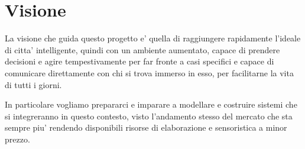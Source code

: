\section{Visione}

La visione che guida questo progetto e' quella di raggiungere rapidamente l'ideale di citta' intelligente, quindi con un ambiente aumentato, capace di prendere decisioni e agire tempestivamente per far fronte a casi specifici e capace di comunicare direttamente con chi si trova immerso in esso, per facilitarne la vita di tutti i giorni. 

In particolare vogliamo prepararci e imparare a modellare e costruire sistemi che si integreranno in questo contesto, visto l'andamento stesso del mercato che sta sempre piu' rendendo disponibili risorse di elaborazione e sensoristica a minor prezzo.
